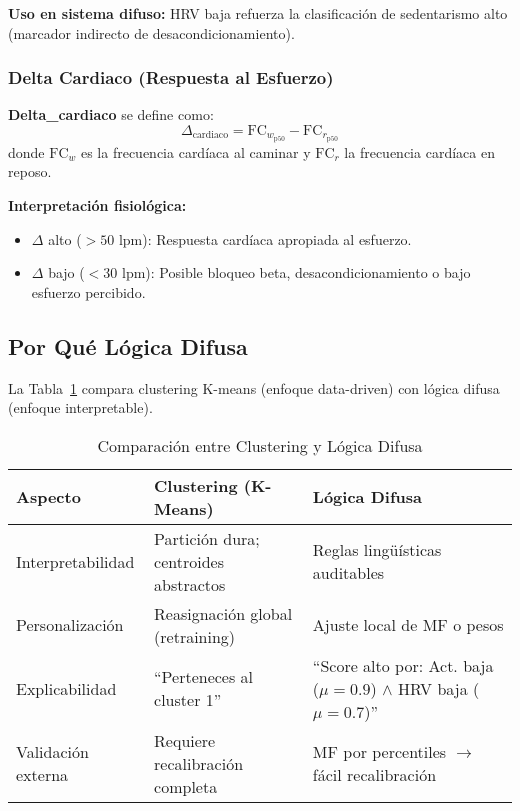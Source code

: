 \documentclass[12pt,a4paper,twoside]{article}
\newcommand{\FCr}{\mathrm{FC}_r}
\newcommand{\FCw}{\mathrm{FC}_w}
\begin{document}
\textbf{Uso en sistema difuso:} HRV baja refuerza la clasificación de sedentarismo alto (marcador indirecto de desacondicionamiento).

\subsubsection{Delta Cardiaco (Respuesta al Esfuerzo)}

\begin{definicion}
\textbf{Delta\_cardiaco} se define como:
\begin{equation}
\Delta_{\text{cardiaco}} = \FCw_{\text{p50}} - \FCr_{\text{p50}}
\end{equation}
donde $\FCw$ es la frecuencia cardíaca al caminar y $\FCr$ la frecuencia cardíaca en reposo.
\end{definicion}

\textbf{Interpretación fisiológica:}
\begin{itemize}
    \item $\Delta$ alto ($>50$ lpm): Respuesta cardíaca apropiada al esfuerzo.
    \item $\Delta$ bajo ($<30$ lpm): Posible bloqueo beta, desacondicionamiento o bajo esfuerzo percibido.
\end{itemize}

\subsection{Por Qué Lógica Difusa}

La Tabla~\ref{tab:fuzzy_vs_clustering} compara clustering K-means (enfoque data-driven) con lógica difusa (enfoque interpretable).

\begin{table}[h]
\centering
\caption{Comparación entre Clustering y Lógica Difusa}
\label{tab:fuzzy_vs_clustering}
\small
\begin{tabularx}{\textwidth}{l X X}
\toprule
\textbf{Aspecto} & \textbf{Clustering (K-Means)} & \textbf{Lógica Difusa} \\
\midrule
Interpretabilidad & Partición dura; centroides abstractos & Reglas lingüísticas auditables \\
Personalización & Reasignación global (retraining) & Ajuste local de MF o pesos \\
Explicabilidad & ``Perteneces al cluster 1'' & ``Score alto por: Act. baja ($\mu=0.9$) $\land$ HRV baja ($\mu=0.7$)'' \\
Validación externa & Requiere recalibración completa & MF por percentiles $\rightarrow$ fácil recalibración \\
\bottomrule
\end{tabularx}
\end{table}
\end{document}

